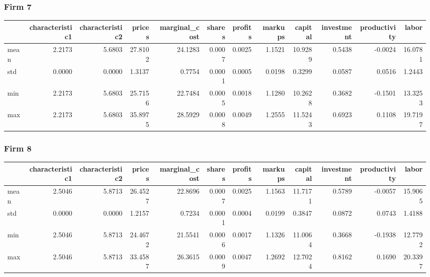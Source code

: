  \subsubsection*{Firm 7}
\begin{tabular}{lrrrrrrrrrrr}
\toprule
{} &  characteristic1 &  characteristic2 &  prices &  marginal\_cost &  shares &  profits &  markups &  capital &  investment &  productivity &   labor \\
\midrule
mean &           2.2173 &           5.6803 & 27.8102 &        24.1283 &  0.0007 &   0.0025 &   1.1521 &  10.9289 &      0.5438 &       -0.0024 & 16.0781 \\
std  &           0.0000 &           0.0000 &  1.3137 &         0.7754 &  0.0001 &   0.0005 &   0.0198 &   0.3299 &      0.0587 &        0.0516 &  1.2443 \\
min  &           2.2173 &           5.6803 & 25.7156 &        22.7484 &  0.0005 &   0.0018 &   1.1280 &  10.2628 &      0.3682 &       -0.1501 & 13.3253 \\
max  &           2.2173 &           5.6803 & 35.8975 &        28.5929 &  0.0008 &   0.0049 &   1.2555 &  11.5243 &      0.6923 &        0.1108 & 19.7197 \\
\bottomrule
\end{tabular}


 \subsubsection*{Firm 8}
\begin{tabular}{lrrrrrrrrrrr}
\toprule
{} &  characteristic1 &  characteristic2 &  prices &  marginal\_cost &  shares &  profits &  markups &  capital &  investment &  productivity &   labor \\
\midrule
mean &           2.5046 &           5.8713 & 26.4527 &        22.8696 &  0.0007 &   0.0025 &   1.1563 &  11.7171 &      0.5789 &       -0.0057 & 15.9065 \\
std  &           0.0000 &           0.0000 &  1.2157 &         0.7234 &  0.0001 &   0.0004 &   0.0199 &   0.3847 &      0.0872 &        0.0743 &  1.4188 \\
min  &           2.5046 &           5.8713 & 24.4672 &        21.5541 &  0.0006 &   0.0017 &   1.1326 &  11.0064 &      0.3668 &       -0.1938 & 12.7792 \\
max  &           2.5046 &           5.8713 & 33.4587 &        26.3615 &  0.0009 &   0.0047 &   1.2692 &  12.7024 &      0.8162 &        0.1690 & 20.3397 \\
\bottomrule
\end{tabular}


